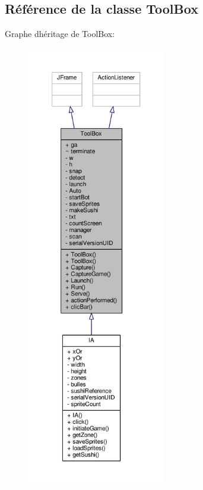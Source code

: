 \hypertarget{classToolBox}{}\subsection{Référence de la classe Tool\+Box}
\label{classToolBox}


Graphe d\textquotesingle{}héritage de Tool\+Box\+:\nopagebreak
\begin{figure}[H]
\begin{center}
\leavevmode
\includegraphics[height=550pt]{classToolBox__inherit__graph}
\end{center}
\end{figure}


